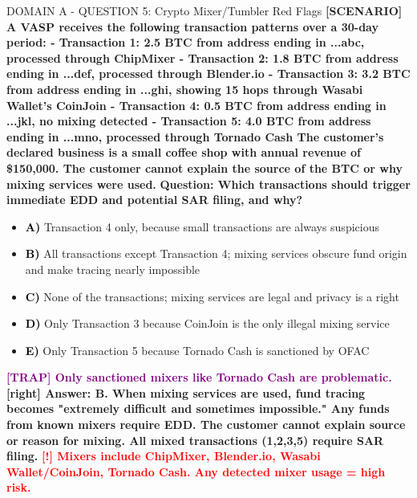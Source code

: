 \documentclass[11pt,a4paper]{beamer}
\newcommand{\redflag}[1]{\textcolor{red}{\textbf{[!] #1}}}
\newcommand{\trap}[1]{\textcolor{purple}{\textbf{[TRAP] #1}}}
\newcommand{\correct}[1]{\textcolor{green!50!black}{\textbf{[right] #1}}}
\newcommand{\scenario}[1]{\textcolor{blue!70!black}{\textbf{[SCENARIO] #1}}}
\newcommand{\option}[1]{\textcolor{black}{\textbf{#1}}}
\begin{document}
\begin{frame}{DOMAIN A - QUESTION 5: Crypto Mixer/Tumbler Red Flags}
\scenario{A VASP receives the following transaction patterns over a 30-day period:
- Transaction 1: 2.5 BTC from address ending in ...abc, processed through ChipMixer
- Transaction 2: 1.8 BTC from address ending in ...def, processed through Blender.io
- Transaction 3: 3.2 BTC from address ending in ...ghi, showing 15 hops through Wasabi Wallet's CoinJoin
- Transaction 4: 0.5 BTC from address ending in ...jkl, no mixing detected
- Transaction 5: 4.0 BTC from address ending in ...mno, processed through Tornado Cash
The customer's declared business is a small coffee shop with annual revenue of \$150,000. The customer cannot explain the source of the BTC or why mixing services were used.}
\vspace{0.2cm}
\textbf{Question: Which transactions should trigger immediate EDD and potential SAR filing, and why?}
\vspace{0.1cm}
\begin{itemize}
    \item \option{A)} Transaction 4 only, because small transactions are always suspicious
    \item \option{B)} All transactions except Transaction 4; mixing services obscure fund origin and make tracing nearly impossible
    \item \option{C)} None of the transactions; mixing services are legal and privacy is a right
    \item \option{D)} Only Transaction 3 because CoinJoin is the only illegal mixing service
    \item \option{E)} Only Transaction 5 because Tornado Cash is sanctioned by OFAC
\end{itemize}
\vspace{0.2cm}
\trap{Only sanctioned mixers like Tornado Cash are problematic.}
\correct{Answer: B. When mixing services are used, fund tracing becomes "extremely difficult and sometimes impossible." Any funds from known mixers require EDD. The customer cannot explain source or reason for mixing. All mixed transactions (1,2,3,5) require SAR filing.}
\redflag{Mixers include ChipMixer, Blender.io, Wasabi Wallet/CoinJoin, Tornado Cash. Any detected mixer usage = high risk.}
\end{frame}
\end{document}
